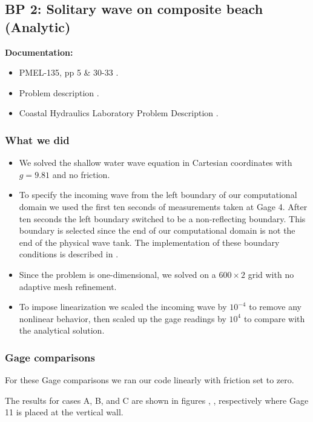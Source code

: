 \newsection

\subsection{BP 2:
 Solitary wave on composite beach (Analytic)}

{\bf Documentation:}

\begin{itemize}
\item PMEL-135, pp 5 \& 30-33 \cite{SynolakisBernard:pmel135}.
\item Problem description \cite{bp-description}.
\item Coastal Hydraulics Laboratory Problem Description \cite{CHLBP2}.
\end{itemize}

\subsubsection{What we did}
\begin{itemize}

\item We solved the shallow water wave equation in Cartesian coordinates with $g = 9.81$ and no friction.
\item To specify the incoming wave from the left boundary of our computational domain we used the first ten seconds of  measurements taken at Gage 4.  After ten seconds the left boundary switched to be a non-reflecting boundary.  This boundary is selected since the end of our computational domain is not the end of the physical wave tank.  
The implementation of these boundary conditions is described in .
\item Since the problem is one-dimensional, we solved on a $600 \times 2$ grid with no adaptive mesh refinement.
\item To impose linearization we scaled the incoming wave by $10^{-4}$ to
remove  any nonlinear behavior, then scaled up the gage readings by $10^4$
to compare with the analytical solution.
\end{itemize}

\subsubsection{Gage comparisons}
For these Gage comparisons we ran our code linearly with friction set to zero. 

The results for cases A, B, and C are shown in figures , ,  respectively where Gage 11 is placed at the vertical wall.

